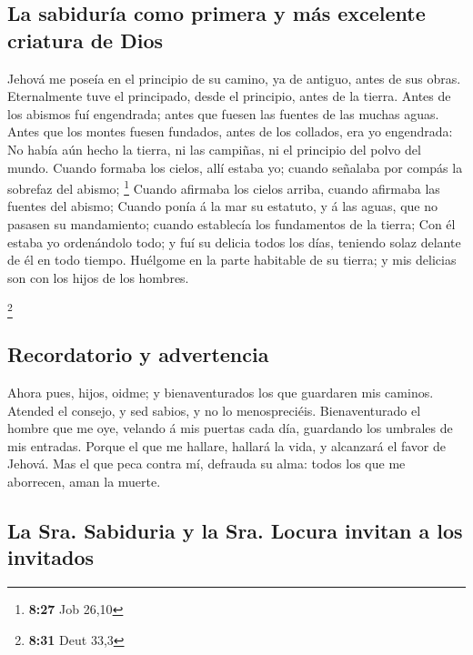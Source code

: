 \hypertarget{la-sabiduruxeda-como-primera-y-muxe1s-excelente-criatura-de-dios}{%
\subsection{La sabiduría como primera y más excelente criatura de
Dios}\label{la-sabiduruxeda-como-primera-y-muxe1s-excelente-criatura-de-dios}}

 Jehová me poseía en el principio de su camino, ya de
antiguo, antes de sus obras.  Eternalmente tuve el
principado, desde el principio, antes de la tierra.  Antes
de los abismos fuí engendrada; antes que fuesen las fuentes de las
muchas aguas.  Antes que los montes fuesen fundados, antes
de los collados, era yo engendrada:  No había aún hecho la
tierra, ni las campiñas, ni el principio del polvo del mundo.
 Cuando formaba los cielos, allí estaba yo; cuando señalaba
por compás la sobrefaz del abismo; \footnote{\textbf{8:27} Job 26,10}
 Cuando afirmaba los cielos arriba, cuando afirmaba las
fuentes del abismo;  Cuando ponía á la mar su estatuto, y á
las aguas, que no pasasen su mandamiento; cuando establecía los
fundamentos de la tierra;  Con él estaba yo ordenándolo
todo; y fuí su delicia todos los días, teniendo solaz delante de él en
todo tiempo.  Huélgome en la parte habitable de su tierra;
y mis delicias son con los hijos de los hombres.

\footnote{\textbf{8:31} Deut 33,3}

\hypertarget{recordatorio-y-advertencia}{%
\subsection{Recordatorio y
advertencia}\label{recordatorio-y-advertencia}}

 Ahora pues, hijos, oidme; y bienaventurados los que
guardaren mis caminos.  Atended el consejo, y sed sabios, y
no lo menospreciéis.  Bienaventurado el hombre que me oye,
velando á mis puertas cada día, guardando los umbrales de mis entradas.
 Porque el que me hallare, hallará la vida, y alcanzará el
favor de Jehová.  Mas el que peca contra mí, defrauda su
alma: todos los que me aborrecen, aman la muerte.

\hypertarget{la-sra.-sabiduria-y-la-sra.-locura-invitan-a-los-invitados}{%
\subsection{La Sra. Sabiduria y la Sra. Locura invitan a los
invitados}\label{la-sra.-sabiduria-y-la-sra.-locura-invitan-a-los-invitados}}

